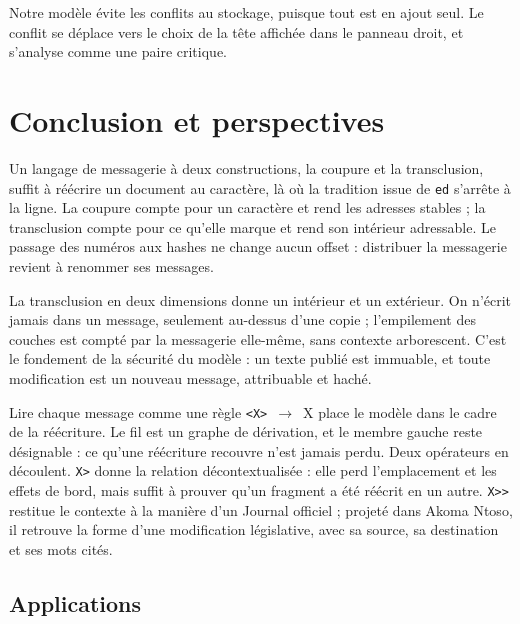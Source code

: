 \documentclass[11pt,a4paper]{article}
\newcommand{\cd}[1]{\texttt{#1}}
\newcommand{\regle}[2]{\cd{<#1>}~$\to$~#2}
\begin{document}
Notre modèle évite les conflits au stockage, puisque tout est en ajout seul. Le conflit se déplace vers le choix de la tête affichée dans le panneau droit, et s'analyse comme une paire critique.

\section{Conclusion et perspectives}

Un langage de messagerie à deux constructions, la coupure et la transclusion, suffit à réécrire un document au caractère, là où la tradition issue de \cd{ed} s'arrête à la ligne. La coupure compte pour un caractère et rend les adresses stables ; la transclusion compte pour ce qu'elle marque et rend son intérieur adressable. Le passage des numéros aux hashes ne change aucun offset : distribuer la messagerie revient à renommer ses messages.

La transclusion en deux dimensions donne un intérieur et un extérieur. On n'écrit jamais dans un message, seulement au-dessus d'une copie ; l'empilement des couches est compté par la messagerie elle-même, sans contexte arborescent. C'est le fondement de la sécurité du modèle : un texte publié est immuable, et toute modification est un nouveau message, attribuable et haché.

Lire chaque message comme une règle \regle{X}{X} place le modèle dans le cadre de la réécriture. Le fil est un graphe de dérivation, et le membre gauche reste désignable : ce qu'une réécriture recouvre n'est jamais perdu. Deux opérateurs en découlent. \cd{X>} donne la relation décontextualisée : elle perd l'emplacement et les effets de bord, mais suffit à prouver qu'un fragment a été réécrit en un autre. \cd{X>{}>} restitue le contexte à la manière d'un Journal officiel ; projeté dans Akoma Ntoso, il retrouve la forme d'une modification législative, avec sa source, sa destination et ses mots cités.

\subsection{Applications}
\end{document}

